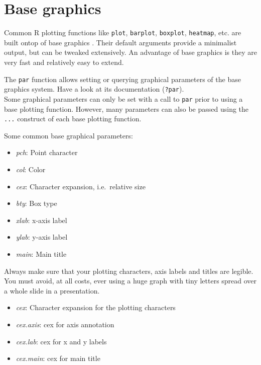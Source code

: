 \documentclass[
]{book}
\providecommand{\tightlist}{%
  \setlength{\itemsep}{0pt}\setlength{\parskip}{0pt}}
\begin{document}
\hypertarget{base-graphics}{%
\section{Base graphics}\label{base-graphics}}

Common R plotting functions like \texttt{plot}, \texttt{barplot}, \texttt{boxplot}, \texttt{heatmap}, etc. are built ontop of base graphics \citep{murrell2018r}. Their default arguments provide a minimalist output, but can be tweaked extensively. An advantage of base graphics is they are very fast and relatively easy to extend.

The \texttt{par} function allows setting or querying graphical parameters of the base graphics system. Have a look at its documentation (\texttt{?par}).\\
Some graphical parameters can only be set with a call to \texttt{par} prior to using a base plotting function. However, many parameters can also be passed using the \texttt{...} construct of each base plotting function.

Some common base graphical parameters:

\begin{itemize}
\tightlist
\item
  \emph{pch}: Point character
\item
  \emph{col}: Color
\item
  \emph{cex}: Character expansion, i.e.~relative size
\item
  \emph{bty}: Box type
\item
  \emph{xlab}: x-axis label
\item
  \emph{ylab}: y-axis label
\item
  \emph{main}: Main title
\end{itemize}

Always make sure that your plotting characters, axis labels and titles are legible. You must avoid, at all costs, ever using a huge graph with tiny letters spread over a whole slide in a presentation.

\begin{itemize}
\tightlist
\item
  \emph{cex}: Character expansion for the plotting characters
\item
  \emph{cex.axis}: cex for axis annotation
\item
  \emph{cex.lab}: cex for x and y labels
\item
  \emph{cex.main}: cex for main title
\end{itemize}
\end{document}
